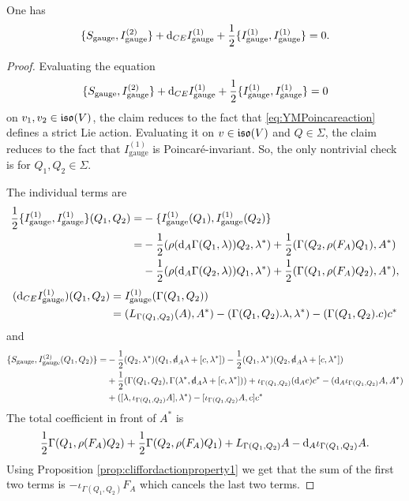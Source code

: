 \documentclass[10pt, oneside]{article}
\newcommand{\gauge}{\mathrm{gauge}}
\begin{document}
\begin{lemma}
One has
\[\{S_{\gauge}, I_{\gauge}^{(2)}\} + \d_{CE} I_{\gauge}^{(1)} + \frac{1}{2}\{I_{\gauge}^{(1)}, I_{\gauge}^{(1)}\} = 0.\]
\label{lm:gaugemultiplet2}
\end{lemma}
\begin{proof}
Evaluating the equation
\[\{S_{\gauge}, I_{\gauge}^{(2)}\} + \d_{CE} I_{\gauge}^{(1)} + \frac{1}{2}\{I_{\gauge}^{(1)}, I_{\gauge}^{(1)}\} = 0\]
on $v_1, v_2\in \mathfrak{iso}(V)$, the claim reduces to the fact that \eqref{eq:YMPoincareaction} defines a strict Lie action. Evaluating it on $v\in\mathfrak{iso}(V)$ and $Q\in\Sigma$, the claim reduces to the fact that $I_{\gauge}^{(1)}$ is Poincar\'{e}-invariant. So, the only nontrivial check is for $Q_1,Q_2\in\Sigma$.

The individual terms are
\begin{align*}
\frac{1}{2}\{I_{\gauge}^{(1)}, I_{\gauge}^{(1)}\}(Q_1, Q_2) = &-\{I_{\gauge}^{(1)}(Q_1), I_{\gauge}^{(1)}(Q_2)\} \\
= &-\frac{1}{2}(\rho(\d_A \Gamma(Q_1, \lambda)) Q_2, \lambda^*) + \frac{1}{2}(\Gamma(Q_2, \rho(F_A)Q_1), A^*) \\
&-\frac{1}{2}(\rho(\d_A \Gamma(Q_2, \lambda)) Q_1, \lambda^*) + \frac{1}{2}(\Gamma(Q_1, \rho(F_A)Q_2), A^*),
\end{align*}
\begin{align*}
(\d_{CE} I_{\gauge}^{(1)})(Q_1, Q_2) &= I_{\gauge}^{(1)}(\Gamma(Q_1, Q_2)) \\
&= (L_{\Gamma(Q_1, Q_2)}(A), A^*) -(\Gamma(Q_1, Q_2).\lambda, \lambda^*) - (\Gamma(Q_1, Q_2).c) c^*
\end{align*}
and
\begin{align*}
\{S_{\gauge}, I_{\gauge}^{(2)}(Q_1, Q_2)\} = &-\frac{1}{2}(Q_2, \lambda^*)(Q_1, \sd{\d}_A \lambda + [c, \lambda^*]) - \frac{1}{2}(Q_1, \lambda^*)(Q_2, \sd{\d}_A \lambda + [c, \lambda^*]) \\
&+\frac{1}{2}(\Gamma(Q_1, Q_2), \Gamma(\lambda^*, \sd{\d}_A \lambda + [c, \lambda^*])) + \iota_{\Gamma(Q_1, Q_2)}(\d_A c) c^* - (\d_A\iota_{\Gamma(Q_1, Q_2)} A, A^*) \\
&+ ([\lambda, \iota_{\Gamma(Q_1, Q_2)}A], \lambda^*) - [\iota_{\Gamma(Q_1, Q_2)} A, c] c^*
\end{align*}
The total coefficient in front of $A^*$ is
\[\frac{1}{2}\Gamma(Q_1, \rho(F_A)Q_2) + \frac{1}{2}\Gamma(Q_2, \rho(F_A) Q_1) + L_{\Gamma(Q_1, Q_2)} A - {\rm d}_A \iota_{\Gamma(Q_1, Q_2)} A.\]
Using Proposition \ref{prop:cliffordactionproperty1} we get that the sum of the first two terms is $-\iota_{\Gamma(Q_1, Q_2)}F_A$ which cancels the last two terms.


\end{proof}
\end{document}
